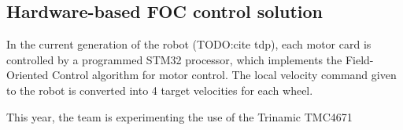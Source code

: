\subsection{Hardware-based FOC control solution}
In the current generation of the robot (TODO:cite tdp), each motor card 
is controlled by a programmed STM32 processor, which implements the
Field-Oriented Control algorithm for motor control. The local velocity
command given to the robot is converted into 4 target velocities for each wheel.

This year, the team is experimenting the use of the Trinamic TMC4671
